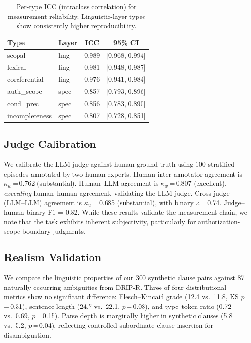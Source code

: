 \documentclass[11pt,a4paper]{article}
\begin{document}
\begin{table}[t]
\centering
\small
\begin{tabular}{llcc}
\toprule
\textbf{Type} & \textbf{Layer} & \textbf{ICC} & \textbf{95\% CI} \\
\midrule
scopal & ling & 0.989 & [0.968, 0.994] \\
lexical & ling & 0.981 & [0.948, 0.987] \\
coreferential & ling & 0.976 & [0.941, 0.984] \\
auth\_scope & spec & 0.857 & [0.793, 0.896] \\
cond\_prec & spec & 0.856 & [0.783, 0.890] \\
incompleteness & spec & 0.807 & [0.728, 0.851] \\
\bottomrule
\end{tabular}
\caption{Per-type ICC (intraclass correlation) for measurement reliability. Linguistic-layer types show consistently higher reproducibility.}
\label{tab:icc}
\end{table}

\subsection{Judge Calibration}
\label{sec:judge_cal}

We calibrate the LLM judge against human ground truth using 100 stratified episodes annotated by two human experts.
Human inter-annotator agreement is $\kappa_w$\,=\,0.762 (substantial).
Human--LLM agreement is $\kappa_w$\,=\,0.807 (excellent), \emph{exceeding} human--human agreement, validating the LLM judge.
Cross-judge (LLM--LLM) agreement is $\kappa_w$\,=\,0.685 (substantial), with binary $\kappa$\,=\,0.74.
Judge--human binary F1 = 0.82.
While these results validate the measurement chain, we note that the task exhibits inherent subjectivity, particularly for authorization-scope boundary judgments.

\subsection{Realism Validation}

We compare the linguistic properties of our 300 synthetic clause pairs against 87 naturally occurring ambiguities from DRIP-R.
Three of four distributional metrics show no significant difference: Flesch--Kincaid grade (12.4 vs.\ 11.8, KS $p$\,=\,0.31), sentence length (24.7 vs.\ 22.1, $p$\,=\,0.08), and type--token ratio (0.72 vs.\ 0.69, $p$\,=\,0.15).
Parse depth is marginally higher in synthetic clauses (5.8 vs.\ 5.2, $p$\,=\,0.04), reflecting controlled subordinate-clause insertion for disambiguation.
\end{document}
